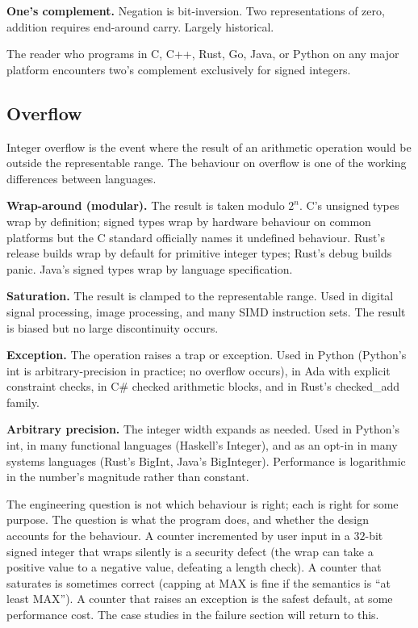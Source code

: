\textbf{One's complement.} Negation is bit-inversion. Two representations of zero, addition requires end-around carry. Largely historical.

The reader who programs in C, C++, Rust, Go, Java, or Python on any major platform encounters two's complement exclusively for signed integers.

\subsection{Overflow}

Integer overflow is the event where the result of an arithmetic operation would be outside the representable range. The behaviour on overflow is one of the working differences between languages.

\textbf{Wrap-around (modular).} The result is taken modulo $2^n$. C's unsigned types wrap by definition; signed types wrap by hardware behaviour on common platforms but the C standard officially names it undefined behaviour. Rust's release builds wrap by default for primitive integer types; Rust's debug builds panic. Java's signed types wrap by language specification.

\textbf{Saturation.} The result is clamped to the representable range. Used in digital signal processing, image processing, and many SIMD instruction sets. The result is biased but no large discontinuity occurs.

\textbf{Exception.} The operation raises a trap or exception. Used in Python (Python's int is arbitrary-precision in practice; no overflow occurs), in Ada with explicit constraint checks, in C\# checked arithmetic blocks, and in Rust's checked\_add family.

\textbf{Arbitrary precision.} The integer width expands as needed. Used in Python's int, in many functional languages (Haskell's Integer), and as an opt-in in many systems languages (Rust's BigInt, Java's BigInteger). Performance is logarithmic in the number's magnitude rather than constant.

The engineering question is not which behaviour is right; each is right for some purpose. The question is what the program does, and whether the design accounts for the behaviour. A counter incremented by user input in a $32$-bit signed integer that wraps silently is a security defect (the wrap can take a positive value to a negative value, defeating a length check). A counter that saturates is sometimes correct (capping at MAX is fine if the semantics is ``at least MAX''). A counter that raises an exception is the safest default, at some performance cost. The case studies in the failure section will return to this.

